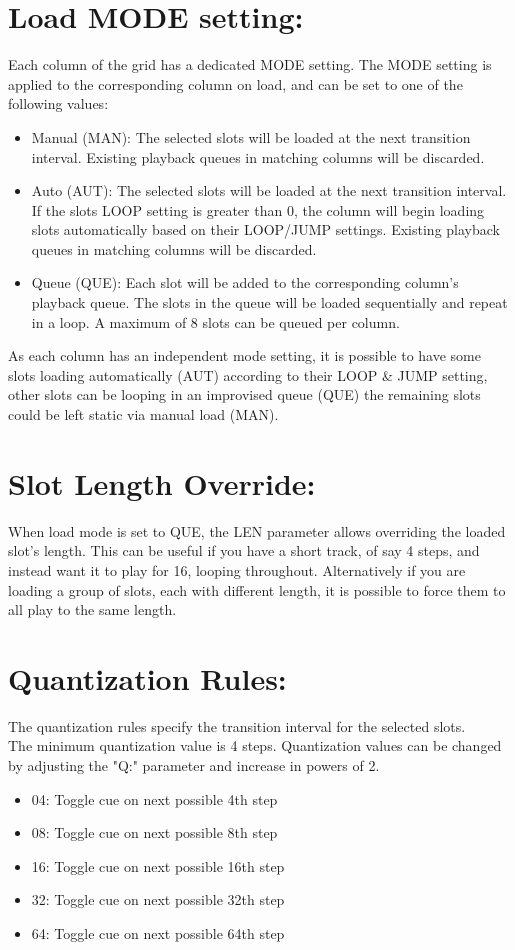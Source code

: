 \section{Load MODE setting:}
Each column of the grid has a dedicated MODE setting. The MODE setting is applied to the corresponding column on load, and can be set to one of the following values:

\begin{itemize}
    \item Manual (MAN):  The selected slots will be loaded at the next transition interval. Existing playback queues in matching columns will be discarded.
    \item Auto (AUT): The selected slots will be loaded at the next transition interval. If the slots LOOP setting is greater than 0, the column will begin loading slots automatically based on their LOOP/JUMP settings. Existing playback queues in matching columns will be discarded.
    \item Queue (QUE): Each slot will be added to the corresponding column's playback queue. The slots in the queue will be loaded sequentially and repeat in a loop. A maximum of 8 slots can be queued per column. 
\end{itemize}

As each column has an independent mode setting, it is possible to have some slots loading automatically (AUT) according to their LOOP \& JUMP setting, other slots can be looping in an improvised queue (QUE) the remaining slots could be left static via manual load (MAN).
\newpage
\section{Slot Length Override:}
When load mode is set to QUE, the LEN parameter allows overriding the loaded slot's length. This can be useful if you have a short track, of say 4 steps, and instead want it to play for 16, looping throughout. Alternatively if you are loading a group of slots, each with different length, it is possible to force them to all play to the same length.

\section{Quantization Rules:}
The quantization rules specify the transition interval for the selected slots.\\
The minimum quantization value is 4 steps. Quantization values can be changed by adjusting the "Q:" parameter and increase in powers of 2.
\begin{itemize}
\item 04: Toggle cue on next possible 4th step
\item 08: Toggle cue on next possible 8th step 
\item 16: Toggle cue on next possible 16th step 
\item 32: Toggle cue on next possible 32th step 
\item 64: Toggle cue on next possible 64th step
\end{itemize}

